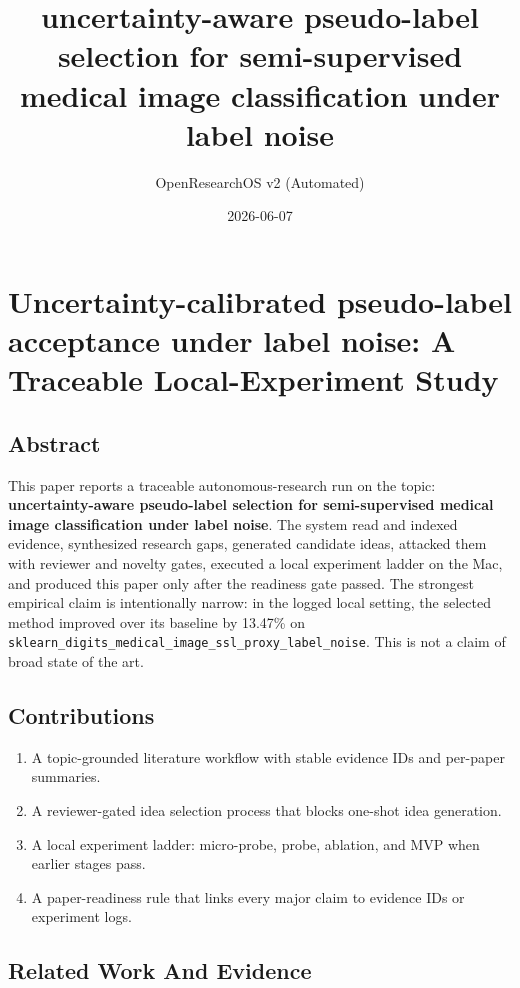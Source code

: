 \documentclass[
  11pt,
]{article}
\title{uncertainty-aware pseudo-label selection for semi-supervised medical image classification under label noise}
\author{OpenResearchOS v2 (Automated)}
\date{2026-06-07}
\providecommand{\tightlist}{%
  \setlength{\itemsep}{0pt}\setlength{\parskip}{0pt}}
\begin{document}
\maketitle

\section{Uncertainty-calibrated pseudo-label acceptance under label noise: A Traceable Local-Experiment Study}\label{uncertainty-calibrated-pseudo-label-acceptance-under-label-noise-a-traceable-local-experiment-study}

\subsection{Abstract}\label{abstract}

This paper reports a traceable autonomous-research run on the topic: \textbf{uncertainty-aware pseudo-label selection for semi-supervised medical image classification under label noise}. The system read and indexed evidence, synthesized research gaps, generated candidate ideas, attacked them with reviewer and novelty gates, executed a local experiment ladder on the Mac, and produced this paper only after the readiness gate passed. The strongest empirical claim is intentionally narrow: in the logged local setting, the selected method improved over its baseline by 13.47\% on \texttt{sklearn\_digits\_medical\_image\_ssl\_proxy\_label\_noise}. This is not a claim of broad state of the art.

\subsection{Contributions}\label{contributions}

\begin{enumerate}
\def\labelenumi{\arabic{enumi}.}
\tightlist
\item
  A topic-grounded literature workflow with stable evidence IDs and per-paper summaries.
\item
  A reviewer-gated idea selection process that blocks one-shot idea generation.
\item
  A local experiment ladder: micro-probe, probe, ablation, and MVP when earlier stages pass.
\item
  A paper-readiness rule that links every major claim to evidence IDs or experiment logs.
\end{enumerate}

\subsection{Related Work And Evidence}\label{related-work-and-evidence}
\end{document}
